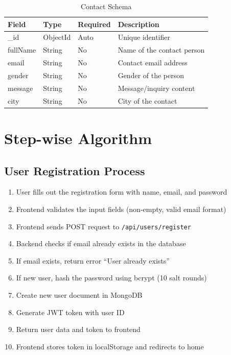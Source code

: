 \documentclass[12pt,a4paper]{article}
\begin{document}
\begin{table}[h!]
\centering
\begin{tabular}{@{}llll@{}}
\toprule
\textbf{Field} & \textbf{Type} & \textbf{Required} & \textbf{Description} \\
\midrule
\_id & ObjectId & Auto & Unique identifier \\
fullName & String & No & Name of the contact person \\
email & String & No & Contact email address \\
gender & String & No & Gender of the person \\
message & String & No & Message/inquiry content \\
city & String & No & City of the contact \\
\bottomrule
\end{tabular}
\caption{Contact Schema}
\end{table}

\newpage
\section{Step-wise Algorithm}

\subsection{User Registration Process}

\begin{enumerate}[label=\textbf{Step \arabic*:}]
    \item User fills out the registration form with name, email, and password
    \item Frontend validates the input fields (non-empty, valid email format)
    \item Frontend sends POST request to \texttt{/api/users/register}
    \item Backend checks if email already exists in the database
    \item If email exists, return error ``User already exists''
    \item If new user, hash the password using bcrypt (10 salt rounds)
    \item Create new user document in MongoDB
    \item Generate JWT token with user ID
    \item Return user data and token to frontend
    \item Frontend stores token in localStorage and redirects to home
\end{enumerate}
\end{document}
